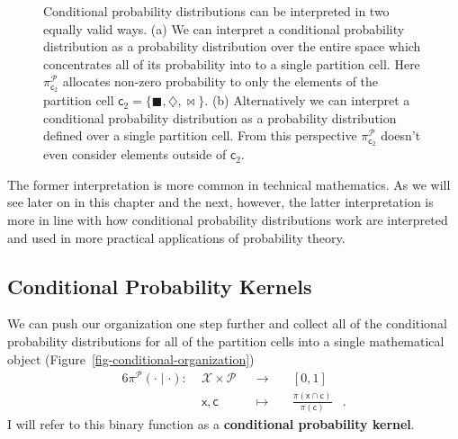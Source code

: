 \documentclass[
  letterpaper,
  DIV=11,
  numbers=noendperiod]{scrartcl}
\begin{document}
\begin{figure}
\begin{minipage}{0.50\linewidth}
\end{minipage}%

\caption{\label{fig-conditional-interpretations}Conditional probability
distributions can be interpreted in two equally valid ways. (a) We can
interpret a conditional probability distribution as a probability
distribution over the entire space which concentrates all of its
probability into to a single partition cell. Here
\(\pi^{\mathcal{P}}_{ \mathsf{c}_{2} }\) allocates non-zero probability
to only the elements of the partition cell
\(\mathsf{c}_{2} = \{ \blacksquare, \diamondsuit, \bowtie \}\). (b)
Alternatively we can interpret a conditional probability distribution as
a probability distribution defined over a single partition cell. From
this perspective \(\pi^{\mathcal{P}}_{ \mathsf{c}_{2} }\) doesn't even
consider elements outside of \(\mathsf{c}_{2}\).}

\end{figure}%

The former interpretation is more common in technical mathematics. As we
will see later on in this chapter and the next, however, the latter
interpretation is more in line with how conditional probability
distributions work are interpreted and used in more practical
applications of probability theory.

\subsection{Conditional Probability
Kernels}\label{conditional-probability-kernels}

We can push our organization one step further and collect all of the
conditional probability distributions for all of the partition cells
into a single mathematical object
(Figure~\ref{fig-conditional-organization}) \begin{alignat*}{6}
\pi^{\mathcal{P}}( \cdot \mid \cdot )
:\; &\mathcal{X} \times \mathcal{P}& &\rightarrow& \; &[0, 1]&
\\
&\mathsf{x}, \mathsf{c}& &\mapsto&
&\frac{ \pi(\mathsf{x} \cap \mathsf{c}) }{ \pi (\mathsf{c}) }&.
\end{alignat*} I will refer to this binary function as a
\textbf{conditional probability kernel}.
\end{document}
